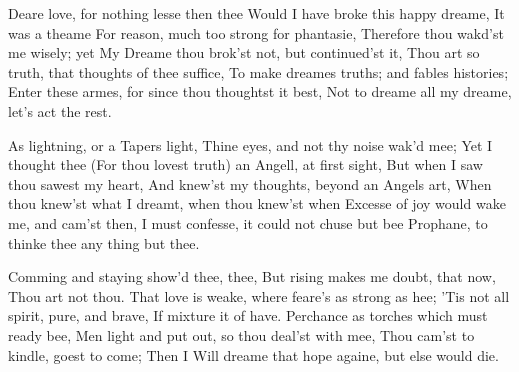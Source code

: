 \documentclass{book}
\newenvironment{poem}[1]%
  {\poemtitle{#1}%
   \Versus
   \numerus{1}%
  }
  {\endVersus}
\begin{document}
    
\begin{poem}{The Dreame} %
\Forma {}
      
  Deare love, for nothing lesse then thee        
  Would I have broke this happy dreame,        
          It was a theame        
  For reason, much too strong for phantasie,        
  Therefore thou wakd'st me wisely; yet       
  My Dreame thou brok'st not, but continued'st it,        
  Thou art so truth, that thoughts of thee suffice,        
  To make dreames truths; and fables histories;        
  Enter these armes, for since thou thoughtst it best, \auto       
  Not to dreame all my dreame, let's act the rest.       
       
  As lightning, or a Tapers light,        
  Thine eyes, and not thy noise wak'd mee;        
          Yet I thought thee        
  (For thou lovest truth) an Angell, at first sight,        
  But when I saw thou sawest my heart,       
  And knew'st my thoughts, beyond an Angels art,        
  When thou knew'st what I dreamt, when thou knew'st when        
  Excesse of joy would wake me, and cam'st then,        
  I must confesse, it could not chuse but bee        
  Prophane, to thinke thee any thing but thee.       
       
  Comming and staying show'd thee, thee,        
  But rising makes me doubt, that now,        
          Thou art not thou.        
  That love is weake, where feare's as strong as hee;        
  'Tis not all spirit, pure, and brave,       
  If mixture it of  have.        
  Perchance as torches which must ready bee,        
  Men light and put out, so thou deal'st with mee,        
  Thou cam'st to kindle, goest to come; Then I        
  Will dreame that hope againe, but else would die.       
\end{poem}
      
    
      
\end{document}
